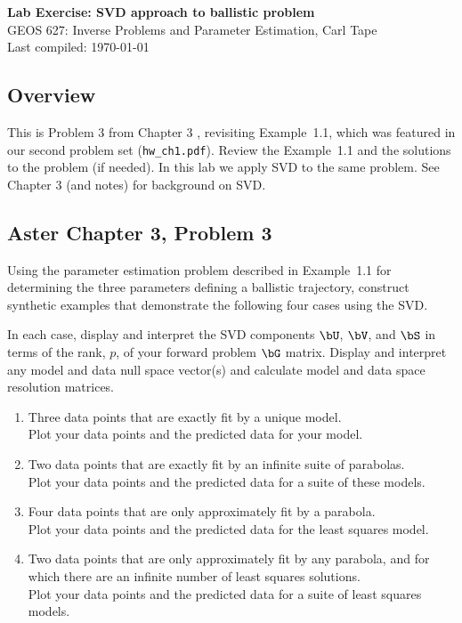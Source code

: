 \documentclass[11pt,titlepage,fleqn]{article}
\begin{document}

\begin{spacing}{1.2}
\centering
{\large \bf Lab Exercise: SVD approach to ballistic problem} \\
GEOS 627: Inverse Problems and Parameter Estimation, Carl Tape \\
Last compiled: \today
\end{spacing}


\subsection*{Overview}

This is Problem 3 from Chapter 3 \citep{AsterE2}, revisiting Example~1.1, which was featured in our second problem set (\verb+hw_ch1.pdf+). Review the Example~1.1 and the solutions to the problem (if needed). In this lab we apply SVD to the same problem. See Chapter 3 (and notes) for background on SVD.


\subsection*{Aster Chapter 3, Problem 3}

Using the parameter estimation problem described in Example~1.1 for determining the three parameters defining a ballistic trajectory, construct synthetic examples that demonstrate the following four cases using the SVD.

In each case, display and interpret the SVD components $\bU$, $\bV$, and $\bS$ in terms of the rank, $p$, of your forward problem $\bG$ matrix. Display and interpret any model and data null space vector(s) and calculate model and data space resolution matrices.
%
\begin{enumerate}
\item Three data points that are exactly fit by a unique model. \\
Plot your data points and the predicted data for your model.

\item Two data points that are exactly fit by an infinite suite of parabolas. \\
Plot your data points and the predicted data for a suite of these models.

\item Four data points that are only approximately fit by a parabola. \\
Plot your data points and the predicted data for the least squares model.

\item Two data points that are only approximately fit by any parabola, and for which there are an infinite number of least squares solutions. \\
Plot your data points and the predicted data for a suite of least squares models.
\end{enumerate}




\end{document}
